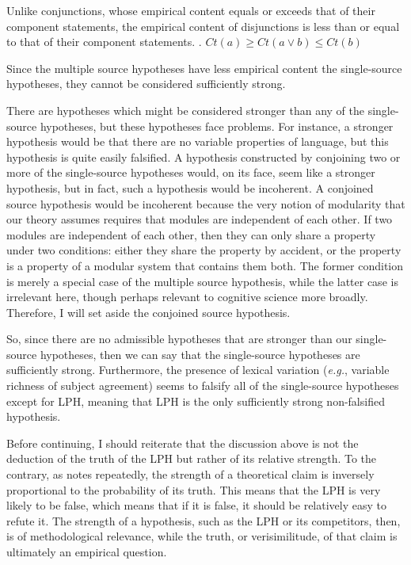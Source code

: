 Unlike conjunctions, whose empirical content equals or exceeds that of their component statements, the empirical content of disjunctions is less than or equal to that of their component statements.
\ex. $Ct(a) \geq Ct(a\vee b) \leq Ct(b)$

Since the multiple source hypotheses have less empirical content the single-source hypotheses, they cannot be considered sufficiently strong.

There are hypotheses which might be considered stronger than any of the single-source hypotheses, but these hypotheses face problems.
For instance, a stronger hypothesis would be that there are no variable properties of language, but this hypothesis is quite easily falsified.
A hypothesis constructed by conjoining two or more of the single-source hypotheses would, on its face, seem like a stronger hypothesis, but in fact, such a hypothesis would be incoherent.
A conjoined source hypothesis would be incoherent because the very notion of modularity that our theory assumes requires that modules are independent of each other.
If two modules are independent of each other, then they can only share a property under two conditions: either they share the property by accident, or the property is a property of a modular system that contains them both.
The former condition is merely a special case of the multiple source hypothesis, while the latter case is irrelevant here, though perhaps relevant to cognitive science more broadly.
Therefore, I will set aside the conjoined source hypothesis.

So, since there are no admissible hypotheses that are stronger than our single-source hypotheses, then we can say that the single-source hypotheses are sufficiently strong.
Furthermore, the presence of lexical variation (\textit{e.g.}, variable richness of subject agreement) seems to falsify all of the single-source hypotheses except for LPH, meaning that LPH is the only sufficiently strong non-falsified hypothesis.

Before continuing, I should reiterate that the discussion above is not the deduction of the truth of the LPH but rather of its relative strength.
To the contrary, as \textcite{popper2014conjectures} notes repeatedly, the strength of a theoretical claim is inversely proportional to the probability of its truth.
This means that the LPH is very likely to be false, which means that if it is false, it should be relatively easy to refute it.
The strength of a hypothesis, such as the LPH or its competitors, then, is of methodological relevance, while the truth, or verisimilitude, of that claim is ultimately an empirical question.

